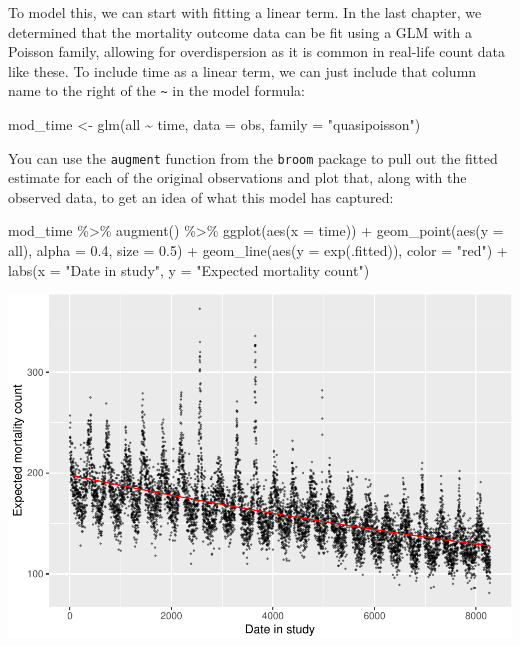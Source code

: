 \documentclass[
]{book}
\newenvironment{Shaded}{\begin{snugshade}}{\end{snugshade}}
\newcommand{\AttributeTok}[1]{\textcolor[rgb]{0.77,0.63,0.00}{#1}}
\newcommand{\FloatTok}[1]{\textcolor[rgb]{0.00,0.00,0.81}{#1}}
\newcommand{\FunctionTok}[1]{\textcolor[rgb]{0.00,0.00,0.00}{#1}}
\newcommand{\NormalTok}[1]{#1}
\newcommand{\OtherTok}[1]{\textcolor[rgb]{0.56,0.35,0.01}{#1}}
\newcommand{\SpecialCharTok}[1]{\textcolor[rgb]{0.00,0.00,0.00}{#1}}
\newcommand{\StringTok}[1]{\textcolor[rgb]{0.31,0.60,0.02}{#1}}
\begin{document}
To model this, we can start with fitting a linear term. In the last chapter,
we determined that the mortality outcome data can be fit using a GLM with a
Poisson family, allowing for overdispersion as it is common in real-life
count data like these. To include time as a linear term, we can just include
that column name to the right of the \texttt{\textasciitilde{}} in the model formula:

\begin{Shaded}
\begin{Highlighting}[]
\NormalTok{mod\_time }\OtherTok{\textless{}{-}} \FunctionTok{glm}\NormalTok{(all }\SpecialCharTok{\textasciitilde{}}\NormalTok{ time, }
                \AttributeTok{data =}\NormalTok{ obs, }\AttributeTok{family =} \StringTok{"quasipoisson"}\NormalTok{)}
\end{Highlighting}
\end{Shaded}

You can use the \texttt{augment} function from the \texttt{broom} package to pull out the
fitted estimate for each of the original observations and plot that, along
with the observed data, to get an idea of what this model has captured:

\begin{Shaded}
\begin{Highlighting}[]
\NormalTok{mod\_time }\SpecialCharTok{\%\textgreater{}\%} 
  \FunctionTok{augment}\NormalTok{() }\SpecialCharTok{\%\textgreater{}\%} 
  \FunctionTok{ggplot}\NormalTok{(}\FunctionTok{aes}\NormalTok{(}\AttributeTok{x =}\NormalTok{ time)) }\SpecialCharTok{+} 
  \FunctionTok{geom\_point}\NormalTok{(}\FunctionTok{aes}\NormalTok{(}\AttributeTok{y =}\NormalTok{ all), }\AttributeTok{alpha =} \FloatTok{0.4}\NormalTok{, }\AttributeTok{size =} \FloatTok{0.5}\NormalTok{) }\SpecialCharTok{+} 
  \FunctionTok{geom\_line}\NormalTok{(}\FunctionTok{aes}\NormalTok{(}\AttributeTok{y =} \FunctionTok{exp}\NormalTok{(.fitted)), }\AttributeTok{color =} \StringTok{"red"}\NormalTok{) }\SpecialCharTok{+} 
  \FunctionTok{labs}\NormalTok{(}\AttributeTok{x =} \StringTok{"Date in study"}\NormalTok{, }\AttributeTok{y =} \StringTok{"Expected mortality count"}\NormalTok{) }
\end{Highlighting}
\end{Shaded}

\includegraphics{adv_epi_analysis_files/figure-latex/unnamed-chunk-50-1.pdf}
\end{document}
